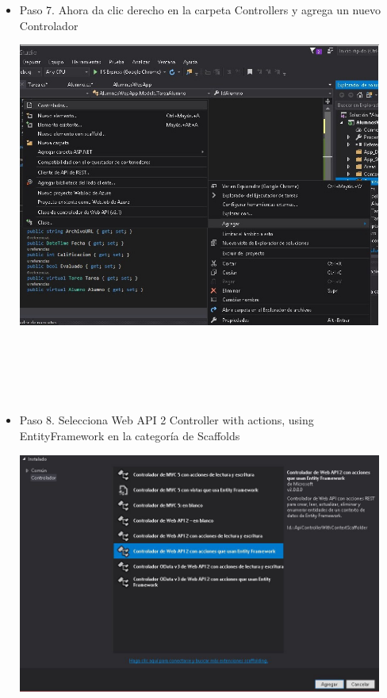 \begin{flushleft}
\begin{itemize}
\item  Paso 7. Ahora da clic derecho en la carpeta Controllers y agrega un nuevo Controlador

\begin{center}
	\includegraphics[width=12cm]{./Imagenes/paso7} 
	\end{center}
\textbf{ }\\
\textbf{ }\\
\textbf{ }\\
\textbf{ }\\
\item Paso 8. Selecciona Web API 2 Controller with actions, using EntityFramework en la categoría de Scaffolds
\begin{center}
	\includegraphics[width=12cm]{./Imagenes/paso8} 
	\end{center}


\end{itemize}
\end{flushleft}
